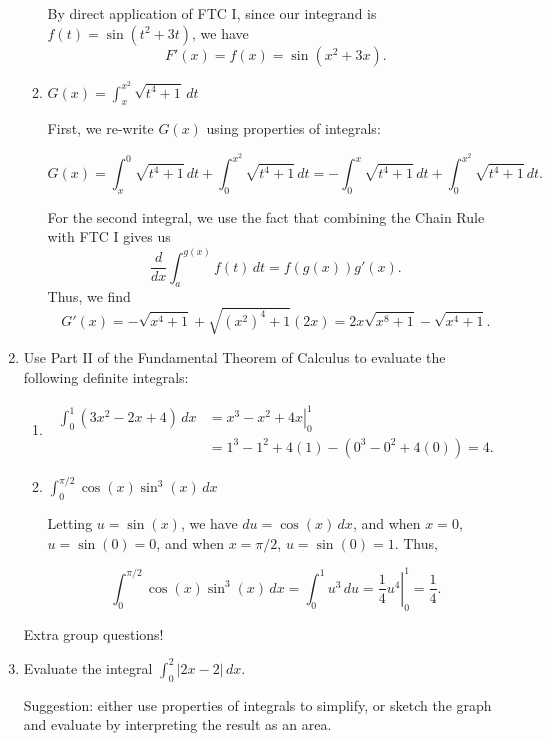 \documentclass[12pt]{article}
\newcommand{\points}[1]{\marginpar{\hspace{24pt}[#1]}}
\newcommand{\di}{\displaystyle}
\newcommand{\abs}[1]{\lvert #1\rvert}
\begin{document}
\begin{enumerate}
\begin{enumerate}
 By direct application of FTC I, since our integrand is $f(t)=\sin(t^2+3t)$, we have
 \[
 F'(x) = f(x) = \sin(x^2+3x).
 \]
 
 \medskip
 
 \item $\di G(x) = \int_x^{x^2}\sqrt{t^4+1}\,dt$ \points{3}
 
 First, we re-write $G(x)$ using properties of integrals:
 
 \[
 G(x) = \int_x^0 \sqrt{t^4+1}\,dt + \int_0^{x^2}\sqrt{t^4+1}\,dt = -\int_0^x\sqrt{t^4+1}\,dt + \int_0^{x^2}\sqrt{t^4+1}\,dt.
 \]
 
 For the second integral, we use the fact that combining the Chain Rule with FTC I gives us
 \[
 \frac{d}{dx}\int_a^{g(x)}f(t)\,dt = f(g(x))g'(x).
 \]
 Thus, we find
 \[
 G'(x) = -\sqrt{x^4+1}+\sqrt{(x^2)^4+1}(2x) = 2x\sqrt{x^8+1}-\sqrt{x^4+1}.
 \]
 
 \bigskip
 
  \end{enumerate}
 \item Use Part II of the Fundamental Theorem of Calculus to evaluate the following definite integrals:
 \begin{enumerate}
 \item \points{3}\begin{align*}
   \int_0^1\left(3x^2-2x+4\right)\,dx & = \left.x^3-x^2+4x\right|_0^1\\
   & = 1^3-1^2+4(1)-(0^3-0^2+4(0)) = 4.
 \end{align*}

 \bigskip
 
  
 \item $\di \int_0^{\pi/2}\cos(x)\sin^3(x)\,dx$ \points{4}
 
 \medskip
 
 Letting $u=\sin(x)$, we have $du = \cos(x)\,dx$, and when $x=0$, $u=\sin(0)=0$, and when $x=\pi/2$, $u=\sin(0)=1$. Thus,
 
 \[
 \int_0^{\pi/2}\cos(x)\sin^3(x)\,dx = \int_0^1 u^3\,du = \left.\frac{1}{4}u^4\right|_0^1 = \frac{1}{4}.
 \]
 \end{enumerate}
 \newpage
 
 Extra group questions!
 
 \item Evaluate the integral $\di \int_0^2 \abs{2x-2}\,dx$. \points{3}
 
\noindent Suggestion: either use properties of integrals to simplify, or sketch the graph and evaluate by interpreting the result as an area.


\end{enumerate}
\end{document}
